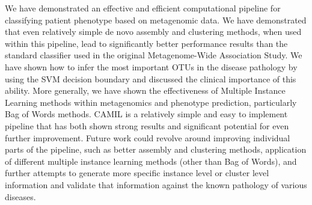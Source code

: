 
We have demonstrated an effective and efficient computational pipeline for classifying patient phenotype based on metagenomic data. We have demonstrated that even relatively simple de novo assembly and clustering methods, when used within this pipeline, lead to significantly better performance results than the standard classifier used in the original Metagenome-Wide Association Study. We have shown how to infer the most important OTUs in the disease pathology by using the SVM decision boundary and discussed the clinical importance of this ability. More generally, we have shown the effectiveness of Multiple Instance Learning methods within metagenomics and phenotype prediction, particularly Bag of Words methods. CAMIL is a relatively simple and easy to implement pipeline that has both shown strong results and significant potential for even further improvement. Future work could revolve around improving individual parts of the pipeline, such as better assembly and clustering methods, application of different multiple instance learning methods (other than Bag of Words), and further attempts to generate more specific instance level or cluster level information and validate that information against the known pathology of various diseases.
